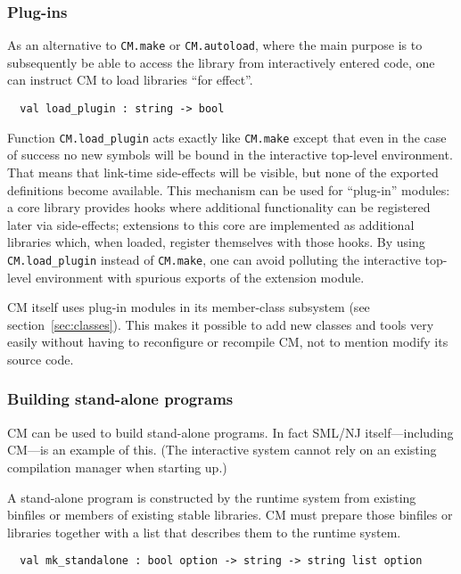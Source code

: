 \documentclass[titlepage,letterpaper]{article}
\begin{document}
\subsubsection*{Plug-ins}

As an alternative to {\tt CM.make} or {\tt CM.autoload}, where the
main purpose is to subsequently be able to access the library from
interactively entered code, one can instruct CM to load libraries
``for effect''.

\begin{verbatim}
  val load_plugin : string -> bool
\end{verbatim}

Function {\tt CM.load\_plugin} acts exactly like {\tt CM.make} except
that even in the case of success no new symbols will be bound in the
interactive top-level environment.  That means that link-time
side-effects will be visible, but none of the exported definitions
become available.  This mechanism can be used for ``plug-in'' modules:
a core library provides hooks where additional functionality can be
registered later via side-effects; extensions to this core are
implemented as additional libraries which, when loaded, register
themselves with those hooks.  By using {\tt CM.load\_plugin} instead
of {\tt CM.make}, one can avoid polluting the interactive top-level
environment with spurious exports of the extension module.

CM itself uses plug-in modules in its member-class subsystem (see
section~\ref{sec:classes}).  This makes it possible to add new classes
and tools very easily without having to reconfigure or recompile CM,
not to mention modify its source code.

\subsubsection*{Building stand-alone programs}

CM can be used to build stand-alone programs. In fact SML/NJ
itself---including CM---is an example of this.  (The interactive
system cannot rely on an existing compilation manager when starting
up.)

A stand-alone program is constructed by the runtime system from
existing binfiles or members of existing stable libraries.  CM must
prepare those binfiles or libraries together with a list that
describes them to the runtime system.

\begin{verbatim}
  val mk_standalone : bool option -> string -> string list option
\end{verbatim}
\end{document}
